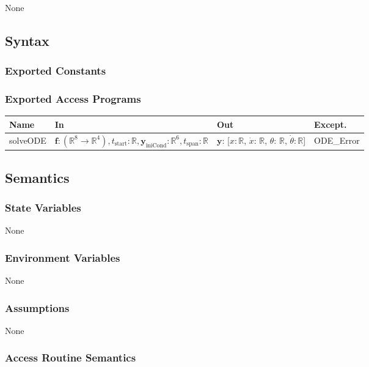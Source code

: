 \documentclass[12pt, titlepage]{article}
\begin{document}
None
\subsection{Syntax}

\subsubsection{Exported Constants}

\subsubsection{Exported Access Programs}

\begin{center}
\begin{tabular}{p{2.5cm} >{\raggedright\arraybackslash}p{8cm} >{\raggedright\arraybackslash}p{2.43cm} p{2cm}}
  \hline
  \textbf{Name} & \textbf{In} & \textbf{Out} & \textbf{Except.} \\
  \hline
  solveODE & $\textbf{f}: (\mathbb{R}^{8} \rightarrow \mathbb{R}^4),  t_\text{start}: \mathbb{R}, \textbf{y}_\text{iniCond}: \mathbb{R}^6, t_\text{span}: \mathbb{R}$ & $\textbf{y}$: [$x$$: \mathbb{R}$, $\dot{x}$: $\mathbb{R}$, $\theta$: $\mathbb{R}$, $\dot{\theta}$$: \mathbb{R}$] & ODE\_Error\\
 
\end{tabular}
\end{center}


\subsection{Semantics}

\subsubsection{State Variables}
None
\subsubsection{Environment Variables}
None
\subsubsection{Assumptions}
None

\subsubsection{Access Routine Semantics}
\end{document}
